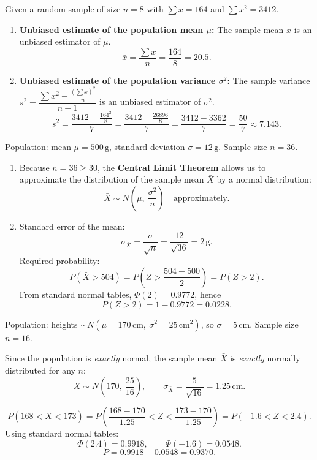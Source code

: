\documentclass[11pt]{article}
\begin{document}
\begin{corrige}
Given a random sample of size \(n = 8\) with \(\sum x = 164\) and \(\sum x^2 = 3412\).

\begin{enumerate}
\item \textbf{Unbiased estimate of the population mean \(\mu\):}
The sample mean \(\bar{x}\) is an unbiased estimator of \(\mu\).
\[
\bar{x} = \frac{\sum x}{n} = \frac{164}{8} = 20.5.
\]

\item \textbf{Unbiased estimate of the population variance \(\sigma^2\):}
The sample variance \(s^2 = \dfrac{\sum x^2 - \frac{(\sum x)^2}{n}}{n-1}\) is an unbiased estimator of \(\sigma^2\).
\[
s^2 = \frac{3412 - \frac{164^2}{8}}{7}
= \frac{3412 - \frac{26896}{8}}{7}
= \frac{3412 - 3362}{7}
= \frac{50}{7} \approx 7.143.
\]
\end{enumerate}
\end{corrige}

\begin{corrige}
Population: mean \(\mu = 500\,\mathrm{g}\), standard deviation \(\sigma = 12\,\mathrm{g}\). Sample size \(n = 36\).

\begin{enumerate}
\item Because \(n = 36 \ge 30\), the \textbf{Central Limit Theorem} allows us to approximate the distribution of the sample mean \(\bar{X}\) by a normal distribution:
\[
\bar{X} \sim N\left(\mu,\ \frac{\sigma^2}{n}\right) \quad\text{approximately}.
\]

\item Standard error of the mean:
\[
\sigma_{\bar{X}} = \frac{\sigma}{\sqrt{n}} = \frac{12}{\sqrt{36}} = 2\,\mathrm{g}.
\]
Required probability:
\[
P(\bar{X} > 504) = P\left(Z > \frac{504-500}{2}\right) = P(Z > 2).
\]
From standard normal tables, \(\Phi(2) = 0.9772\), hence
\[
P(Z > 2) = 1 - 0.9772 = 0.0228.
\]
\end{enumerate}
\end{corrige}

\begin{corrige}
Population: heights \(\sim N(\mu=170\,\mathrm{cm},\ \sigma^2=25\,\mathrm{cm}^2)\), so \(\sigma = 5\,\mathrm{cm}\). Sample size \(n = 16\).

Since the population is \emph{exactly} normal, the sample mean \(\bar{X}\) is \emph{exactly} normally distributed for any \(n\):
\[
\bar{X} \sim N\left(170,\ \frac{25}{16}\right),\qquad
\sigma_{\bar{X}} = \frac{5}{\sqrt{16}} = 1.25\,\mathrm{cm}.
\]

\[
P(168 < \bar{X} < 173) = P\left(\frac{168-170}{1.25} < Z < \frac{173-170}{1.25}\right)
= P(-1.6 < Z < 2.4).
\]
Using standard normal tables:
\[
\Phi(2.4) = 0.9918,\qquad \Phi(-1.6) = 0.0548.
\]
\[
P = 0.9918 - 0.0548 = 0.9370.
\]
\end{corrige}
\end{document}
